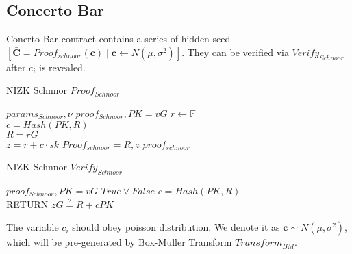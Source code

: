 \documentclass[UTF8]{article}
\begin{document}
\begin{appendices}
\section{Concerto Bar}

Conerto Bar contract contains a series of hidden seed $\left[\mathbf{\bar{C}} = Proof_{schnoor}(\mathbf{c}) \mid \mathbf{c}\leftarrow N(\mu, \sigma^2) \right]$. They can be verified via $Verify_{Schnoor}$ after $c_i$ is revealed.

\begin{algorithm}[H]
  \caption{NIZK Schnnor $Proof_{Schnoor}$}
  \begin{algorithmic}
    \REQUIRE $params_{Schnoor}, \nu$
    \ENSURE $proof_{Schnoor}, PK=vG$
    \STATE $r \leftarrow \mathbb{F}$\\
    $c=Hash(PK, R)$\\
    $R=rG$\\
    $z=r + c\cdot sk$
    $Proof_{schnoor} = R, z$
    \RETURN $proof_{schnoor}$
\end{algorithmic}
\end{algorithm}

\begin{algorithm}[H]
  \caption{NIZK Schnnor $Verify_{Schnoor}$}
  \begin{algorithmic}
    \REQUIRE $proof_{Schnoor}, PK=vG$
    \ENSURE $True \vee False$
    \STATE $c=Hash(PK, R)$\\
    RETURN $zG \stackrel{?}{=}  R + cPK$
\end{algorithmic}
\end{algorithm}


The variable $c_i$ should obey poisson distribution. We denote it as $\mathbf{c} \sim N(\mu, \sigma^2)$, which will be pre-generated by Box-Muller Transform\cite{box1958} $Transform_{BM}$.


\end{appendices}
\end{document}
